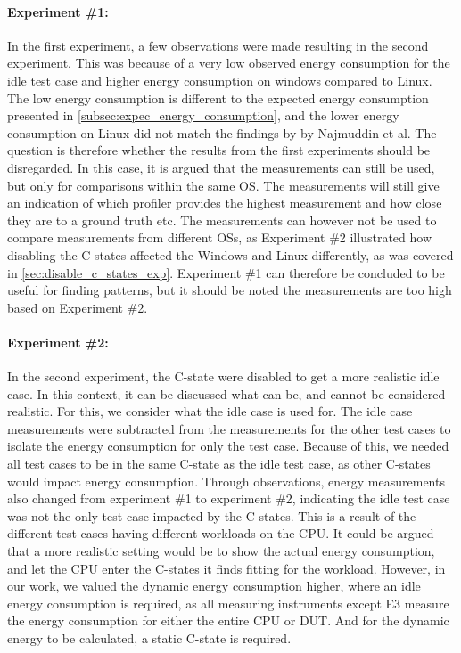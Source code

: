 \paragraph*{Experiment \#1:} In the first experiment, a few observations were made resulting in the second experiment. This was because of a very low observed energy consumption for the idle test case and higher energy consumption on windows compared to Linux. The low energy consumption is different to the expected energy consumption presented in \cref{subsec:expec_energy_consumption}, and the lower energy consumption on Linux did not match the findings by by Najmuddin et al.\cite[]{Najmuddin2021} The question is therefore whether the results from the first experiments should be disregarded. In this case, it is argued that the measurements can still be used, but only for comparisons within the same OS. The measurements will still give an indication of which profiler provides the highest measurement and how close they are to a ground truth etc. The measurements can however not be used to compare measurements from different OSs, as Experiment \#2 illustrated how disabling the C-states affected the Windows and Linux differently, as was covered in \cref{sec:disable_c_states_exp}. Experiment \#1 can therefore be concluded to be useful for finding patterns, but it should be noted the measurements are too high based on Experiment \#2.

\paragraph*{Experiment \#2:} In the second experiment, the C-state were disabled to get a more realistic idle case. In this context, it can be discussed what can be, and cannot be considered realistic. For this, we consider what the idle case is used for. The idle case measurements were subtracted from the measurements for the other test cases to isolate the energy consumption for only the test case. Because of this, we needed all test cases to be in the same C-state as the idle test case, as other C-states would impact energy consumption. Through observations, energy measurements also changed from experiment \#1 to experiment \#2, indicating the idle test case was not the only test case impacted by the C-states. This is a result of the different test cases having different workloads on the CPU. It could be argued that a more realistic setting would be to show the actual energy consumption, and let the CPU enter the C-states it finds fitting for the workload. However, in our work, we valued the dynamic energy consumption higher, where an idle energy consumption is required, as all measuring instruments except E3 measure the energy consumption for either the entire CPU or DUT. And for the dynamic energy to be calculated, a static C-state is required.

